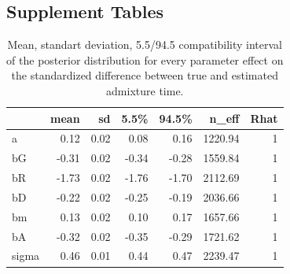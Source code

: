 \documentclass[]{article}
\begin{document}
\subsection{Supplement Tables}

\begin{table}[H]

\caption{\label{tab:tableS1}\label{tab:tableS1} Mean, standart deviation, 5.5/94.5 compatibility interval of the posterior distribution for every parameter effect on the standardized difference between true and estimated admixture time.}
\centering
\begin{tabular}{l|r|r|r|r|r|r}
\hline
  & mean & sd & 5.5\% & 94.5\% & n\_eff & Rhat\\
\hline
a & 0.12 & 0.02 & 0.08 & 0.16 & 1220.94 & 1\\
\cline{1-7}
bG & -0.31 & 0.02 & -0.34 & -0.28 & 1559.84 & 1\\
\cline{1-7}
bR & -1.73 & 0.02 & -1.76 & -1.70 & 2112.69 & 1\\
\cline{1-7}
bD & -0.22 & 0.02 & -0.25 & -0.19 & 2036.66 & 1\\
\cline{1-7}
bm & 0.13 & 0.02 & 0.10 & 0.17 & 1657.66 & 1\\
\cline{1-7}
bA & -0.32 & 0.02 & -0.35 & -0.29 & 1721.62 & 1\\
\cline{1-7}
sigma & 0.46 & 0.01 & 0.44 & 0.47 & 2239.47 & 1\\
\hline
\end{tabular}
\end{table}
\end{document}
